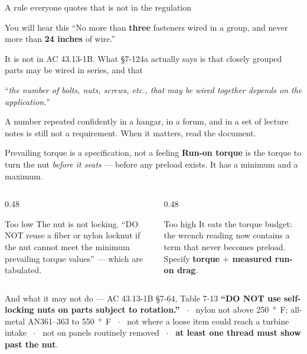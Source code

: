 \documentclass[aspectratio=169,10pt]{beamer}
\begin{document}
\begin{frame}{A rule everyone quotes that is not in the regulation}
\begin{alertblock}{You will hear this}
``No more than \textbf{three} fasteners wired in a group, and never more than \textbf{24 inches}
of wire.''
\end{alertblock}
\vfill
It is not in AC 43.13-1B. What \S7-124a actually says is that closely grouped parts may be wired in
series, and that
\vfill
\begin{block}{}
\centering\large
``\emph{the number of bolts, nuts, screws, etc., that may be wired together depends on the
application.}''
\end{block}
\vfill
\centering
A number repeated confidently in a hangar, in a forum, and in a set of lecture notes is still not a
requirement. \alert{When it matters, read the document.}
\end{frame}

\begin{frame}{Prevailing torque is a specification, not a feeling}
\textbf{Run-on torque} is the torque to turn the nut \emph{before it seats} --- before any preload
exists. It has a minimum \alert{and} a maximum.
\vfill
\begin{columns}[T]
\begin{column}{0.48\textwidth}
\begin{block}{Too low}
The nut is not locking. ``DO NOT reuse a fiber or nylon locknut if the nut cannot meet the minimum
prevailing torque values'' --- which are tabulated.
\end{block}
\end{column}
\begin{column}{0.48\textwidth}
\begin{block}{Too high}
It eats the torque budget: the wrench reading now contains a term that never becomes preload.
\vspace{2pt}
Specify \textbf{torque $+$ measured run-on drag}.
\end{block}
\end{column}
\end{columns}
\vfill
\begin{alertblock}{And what it may not do --- AC 43.13-1B \S7-64, Table 7-13}
{\footnotesize
\textbf{``DO NOT use self-locking nuts on parts subject to rotation.''} \ $\cdot$ \ nylon not above
\SI{250}{\degree F}; all-metal AN361--363 to \SI{550}{\degree F} \ $\cdot$ \ not where a loose item
could reach a turbine intake \ $\cdot$ \ not on panels routinely removed \ $\cdot$ \ \textbf{at
least one thread must show past the nut}.}
\end{alertblock}
\end{frame}
\end{document}
